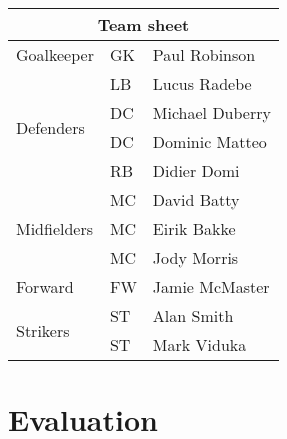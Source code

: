 \documentclass{article}
\begin{document}
\begin{tabular}{|l|l|l|}
\hline
\multicolumn{3}{|c|}{Team sheet} \\
\hline
Goalkeeper & GK & Paul Robinson \\ \hline
\multirow{4}{*}{Defenders} 
 & LB & Lucus Radebe \\
 & DC & Michael Duberry \\
 & DC & Dominic Matteo \\
 & RB & Didier Domi \\ \hline
\multirow{3}{*}{Midfielders} 
 & MC & David Batty \\
 & MC & Eirik Bakke \\
 & MC & Jody Morris \\ \hline
Forward & FW & Jamie McMaster \\ \hline
\multirow{2}{*}{Strikers} 
 & ST & Alan Smith \\
 & ST & Mark Viduka \\
\hline
\end{tabular}

\section{Evaluation}
\end{document}

